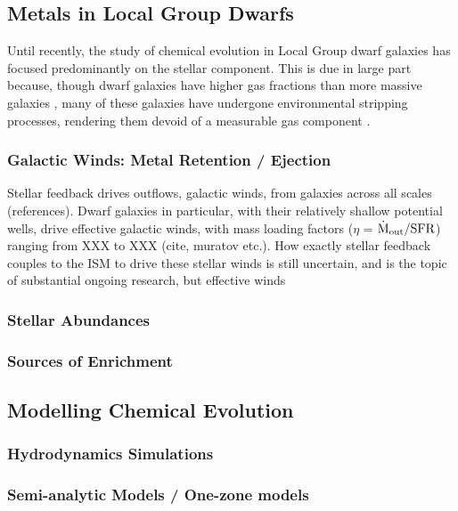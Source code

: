 \subsection{Metals in Local Group Dwarfs}

Until recently, the study of chemical evolution in Local Group dwarf galaxies has focused predominantly on the stellar component. This is due in large part because, though dwarf galaxies have higher gas fractions than more massive galaxies \citep{Geha2006}, many of these galaxies have undergone environmental stripping processes, rendering them devoid of a measurable gas component \citep{GrcevichPutman2009}. 


\subsubsection{Galactic Winds: Metal Retention / Ejection}

Stellar feedback drives outflows, galactic winds, from galaxies across all scales (references). Dwarf galaxies in particular, with their relatively shallow potential wells, drive effective galactic winds, with mass loading factors ($\eta$ = $\dot{\rm{M}}_{\rm out} / {\rm SFR}$) ranging from XXX to XXX (cite, muratov etc.). How exactly stellar feedback couples to the ISM to drive these stellar winds is still uncertain, and is the topic of substantial ongoing research, but effective winds 

\subsubsection{Stellar Abundances}

\subsubsection{Sources of Enrichment}

\subsection{Modelling Chemical Evolution}

\subsubsection{Hydrodynamics Simulations}

\subsubsection{Semi-analytic Models / One-zone models}

